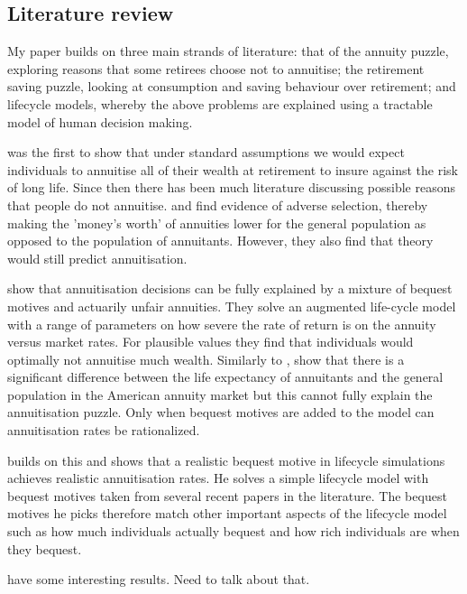\documentclass[12pt]{article}
\begin{document}
\subsection{Literature review}
My paper builds on three main strands of literature: that of the annuity puzzle, exploring reasons that some retirees choose not to annuitise;
the retirement saving puzzle, looking at consumption and saving behaviour over retirement; and lifecycle models, whereby the above
problems are explained using a tractable model of human decision making.

\cite{yaari_65} was the first to show that under standard assumptions we would expect individuals to
annuitise all of their wealth at retirement to insure against the risk of long life. Since then there
has been much literature discussing possible reasons that people do not annuitise. \cite{finkelstein_porteba_2002}
and \cite{finkelstein_porteba_2004} find evidence of adverse selection, thereby making the 'money's worth'
of annuities lower for the general population as opposed to the population of annuitants. However, they
also find that theory would still predict annuitisation.

\cite{friedman_warshawsky_qje_1990} show that annuitisation decisions can be fully explained by a mixture of
bequest motives and actuarily unfair annuities. They solve an augmented life-cycle model with a range of
parameters on how severe the rate of return is on the annuity versus market rates. For plausible values
they find that individuals would optimally not annuitise much wealth. Similarly to \cite{finkelstein_porteba_2004},
\cite{friedman_warshawsky_chicago_1988} show that there is a significant difference between the life expectancy of
annuitants and the general population in the American annuity market but this cannot fully explain the annuitisation
puzzle. Only when bequest motives are added to the model can annuitisation rates be rationalized.

\cite{lockwood_red_2012} builds on this and shows that a realistic bequest motive in lifecycle simulations achieves
realistic annuitisation rates. He solves a simple lifecycle model with bequest motives taken from several recent papers
in the literature. The bequest motives he picks therefore match other important aspects of the lifecycle model such
as how much individuals actually bequest and how rich individuals are when they bequest.

\cite{lockwood_aer_2018}

\cite{vidalmelia_lejarragagarcia_munich_2004} have some interesting results. Need to talk about that.
\end{document}
